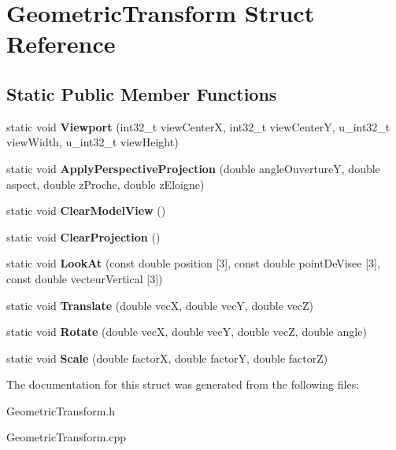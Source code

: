 \hypertarget{structGeometricTransform}{}\section{Geometric\+Transform Struct Reference}
\label{structGeometricTransform}
\subsection*{Static Public Member Functions}
\begin{DoxyCompactItemize}
\item 
\mbox{\label{structGeometricTransform_a4b1fec9e2100e90f8c4f6951601250b3}} 
static void {\bfseries Viewport} (int32\+\_\+t view\+CenterX, int32\+\_\+t view\+CenterY, u\+\_\+int32\+\_\+t view\+Width, u\+\_\+int32\+\_\+t view\+Height)
\item 
\mbox{\label{structGeometricTransform_a8027f49ab23acc7883dc7c2296cd1ab0}} 
static void {\bfseries Apply\+Perspective\+Projection} (double angle\+OuvertureY, double aspect, double z\+Proche, double z\+Eloigne)
\item 
\mbox{\label{structGeometricTransform_a98d5a74aa42cc8c7146999a247862424}} 
static void {\bfseries Clear\+Model\+View} ()
\item 
\mbox{\label{structGeometricTransform_ad5b7d6a6f67352393d01a9d95a7e0177}} 
static void {\bfseries Clear\+Projection} ()
\item 
\mbox{\label{structGeometricTransform_a6fec451ab9c6891495d8c42a9ce1668c}} 
static void {\bfseries Look\+At} (const double position \mbox{[}3\mbox{]}, const double point\+De\+Visee \mbox{[}3\mbox{]}, const double vecteur\+Vertical \mbox{[}3\mbox{]})
\item 
\mbox{\label{structGeometricTransform_a2718e832e79fe8fc013626ede7123ecd}} 
static void {\bfseries Translate} (double vecX, double vecY, double vecZ)
\item 
\mbox{\label{structGeometricTransform_a9222c07c185b1b421ed5838bc9ef5aa0}} 
static void {\bfseries Rotate} (double vecX, double vecY, double vecZ, double angle)
\item 
\mbox{\label{structGeometricTransform_ae65a73ca758839417c94443a15c3ac18}} 
static void {\bfseries Scale} (double factorX, double factorY, double factorZ)
\end{DoxyCompactItemize}


The documentation for this struct was generated from the following files\+:\begin{DoxyCompactItemize}
\item 
Geometric\+Transform.\+h\item 
Geometric\+Transform.\+cpp\end{DoxyCompactItemize}
